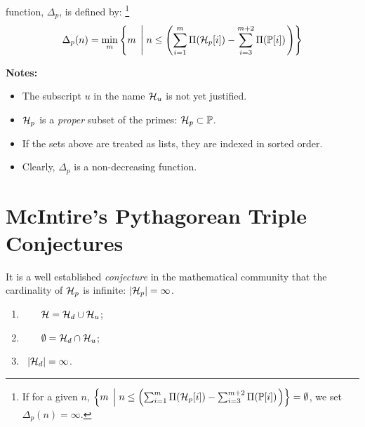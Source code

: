 \documentclass{article}
\theoremstyle{definition}
\begin{document}
 function, $\Delta_p$, is defined by:%
\footnote{If for a given $n$, 
$\left\{ m \; \left| \; n \le \left( \sum_{i=1}^m \Pi({\cal H}_p[i]) - \sum_{i=3}^{m+2} \Pi(\mathbb{P}[i]) \right. \right) \right\} = \emptyset$, we set $\Delta_p(n) = \infty$.}
\begin{eqnarray}
\Delta_p(n) = \mathop{\rm min}\limits_{m} \left\{ m \; \left| \; n \le \left( \sum_{i=1}^m \Pi({\cal H}_p[i]) - \sum_{i=3}^{m+2} \Pi(\mathbb{P}[i])\right. \right) \right\} 
\end{eqnarray}

{\bf Notes:} 
\begin{itemize}
  \item{The subscript $u$ in the name ${\cal H}_u$ is not yet justified.}
  \item{${\cal H}_p$ is a {\em proper\/} subset of the primes: ${\cal H}_p \subset \mathbb{P}$.}
  \item{If the sets above are treated as lists, they are indexed in sorted order.}
  \item{Clearly, $\Delta_p$ is a non-decreasing function.}
\end{itemize}


\section{McIntire's Pythagorean Triple Conjectures}

It is a well established {\em conjecture\/} in the mathematical community that the cardinality of ${\cal H}_p$ is infinite: $|{\cal H}_p| = \infty$.

\begin{enumerate}
  \item{$\hphantom{|{\cal H}_d|}{\cal H} = {\cal H}_{d} \cup {\cal H}_u$;}
  \item{$\hphantom{|{\cal H}_d|}\emptyset = {\cal H}_{d} \cap {\cal H}_u$};
  \item{$\hphantom{\emptyset}|{\cal H}_d| = \infty$.}
\end{enumerate}
\end{document}
